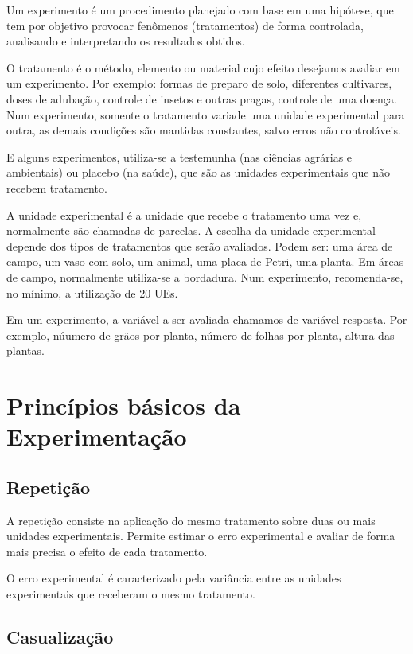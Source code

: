 \documentclass[12pt,brazil,]{book}
\begin{document}
Um experimento é um procedimento planejado com base em uma hipótese, que
tem por objetivo provocar fenômenos (tratamentos) de forma controlada,
analisando e interpretando os resultados obtidos.

O tratamento é o método, elemento ou material cujo efeito desejamos
avaliar em um experimento. Por exemplo: formas de preparo de solo,
diferentes cultivares, doses de adubação, controle de insetos e outras
pragas, controle de uma doença. Num experimento, somente o tratamento
variade uma unidade experimental para outra, as demais condições são
mantidas constantes, salvo erros não controláveis.

E alguns experimentos, utiliza-se a testemunha (nas ciências agrárias e
ambientais) ou placebo (na saúde), que são as unidades experimentais que
não recebem tratamento.

A unidade experimental é a unidade que recebe o tratamento uma vez e,
normalmente são chamadas de parcelas. A escolha da unidade experimental
depende dos tipos de tratamentos que serão avaliados. Podem ser: uma
área de campo, um vaso com solo, um animal, uma placa de Petri, uma
planta. Em áreas de campo, normalmente utiliza-se a bordadura. Num
experimento, recomenda-se, no mínimo, a utilização de 20 UEs.

Em um experimento, a variável a ser avaliada chamamos de variável
resposta. Por exemplo, núumero de grãos por planta, número de folhas por
planta, altura das plantas.

\hypertarget{principios-basicos-da-experimentacao}{%
\section{Princípios básicos da
Experimentação}\label{principios-basicos-da-experimentacao}}

\hypertarget{repeticao}{%
\subsection{Repetição}\label{repeticao}}

A repetição consiste na aplicação do mesmo tratamento sobre duas ou mais
unidades experimentais. Permite estimar o erro experimental e avaliar de
forma mais precisa o efeito de cada tratamento.

O erro experimental é caracterizado pela variância entre as unidades
experimentais que receberam o mesmo tratamento.

\hypertarget{casualizacao}{%
\subsection{Casualização}\label{casualizacao}}
\end{document}

